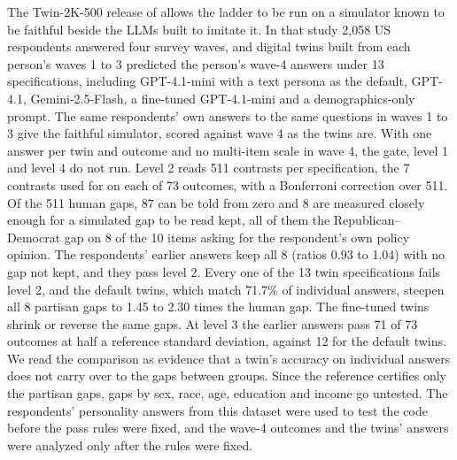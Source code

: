 The Twin-2K-500 release of \citet{toubia2025twin2k} allows the ladder to be run on a simulator known to be faithful beside the LLMs built to imitate it.
In that study 2,058 US respondents answered four survey waves, and digital twins built from each person's waves 1 to 3 predicted the person's wave-4 answers under 13 specifications, including GPT-4.1-mini with a text persona as the default, GPT-4.1, Gemini-2.5-Flash, a fine-tuned GPT-4.1-mini and a demographics-only prompt. %
The same respondents' own answers to the same questions in waves 1 to 3 give the faithful simulator, scored against wave 4 as the twins are.
With one answer per twin and outcome and no multi-item scale in wave 4, the gate, level 1 and level 4 do not run. %
Level 2 reads 511 contrasts per specification, the 7 contrasts used for \citet{bisbee2024synthetic} on each of 73 outcomes, with a Bonferroni correction over 511. %
Of the 511 human gaps, 87 can be told from zero and 8 are measured closely enough for a simulated gap to be read kept, all of them the Republican--Democrat gap on 8 of the 10 items asking for the respondent's own policy opinion. %
The respondents' earlier answers keep all 8 (ratios 0.93 to 1.04) with no gap not kept, and they pass level 2. %
Every one of the 13 twin specifications fails level 2, and the default twins, which match 71.7\% of individual answers, steepen all 8 partisan gaps to 1.45 to 2.30 times the human gap. %
The fine-tuned twins shrink or reverse the same gaps. %
At level 3 the earlier answers pass 71 of 73 outcomes at half a reference standard deviation, against 12 for the default twins. %
We read the comparison as evidence that a twin's accuracy on individual answers does not carry over to the gaps between groups.
Since the reference certifies only the partisan gaps, gaps by sex, race, age, education and income go untested.
The respondents' personality answers from this dataset were used to test the code before the pass rules were fixed, and the wave-4 outcomes and the twins' answers were analyzed only after the rules were fixed.
